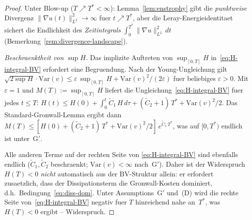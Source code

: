 \documentclass[12pt,a4paper]{article}
\theoremstyle{definition}
\theoremstyle{plain}
\theoremstyle{remark}
\begin{document}
\begin{proof}
Unter Blow-up ($T \nearrow T^* < \infty$):
Lemma~\ref{lem:enstrophy} gibt die \emph{punktweise} Divergenz
$\|\nabla u(t)\|_{L^2}^2 \to \infty$ fuer $t \nearrow T^*$, aber die
Leray-Energieidentitaet sichert die Endlichkeit des \emph{Zeitintegrals}
$\int_0^{T^*}\|\nabla u\|_{L^2}^2\,dt$
(Bemerkung~\ref{rem:divergence-landscape}).

\emph{Beschraenktheit von $\sup H$.}\;
Das implizite Auftreten von $\sup_{[0,T]} H$ in~\eqref{eq:H-integral-BV}
erfordert eine Begruendung. Nach der Young-Ungleichung gilt
$\sqrt{2\sup H}\cdot\mathrm{Var}(v)
\le \varepsilon\,\sup_{[0,T]} H + \mathrm{Var}(v)^2/(2\varepsilon)$
fuer beliebiges $\varepsilon > 0$.
Mit $\varepsilon = 1$ und $M(T) := \sup_{[0,T]} H$ liefert
die Ungleichung~\eqref{eq:H-integral-BV} fuer jedes $t \le T$:
$H(t) \le H(0) + \int_0^t \widetilde{C}_1\,H\,d\tau
+ (\widetilde{C}_2+1)\,T^* + \mathrm{Var}(v)^2/2$.
Das Standard-Gronwall-Lemma ergibt dann
$M(T) \le [H(0) + (\widetilde{C}_2+1)\,T^*
+ \mathrm{Var}(v)^2/2]\,e^{\widetilde{C}_1\,T^*}$,
was auf $[0,T^*)$ endlich ist unter~G$'$.

Alle anderen Terme auf der rechten Seite von
\eqref{eq:H-integral-BV} sind ebenfalls endlich
($\widetilde{C}_1, \widetilde{C}_2$ beschraenkt;
$\mathrm{Var}(v) < \infty$ nach~G$'$).
Daher ist der Widerspruch $H(T) < 0$ \emph{nicht} automatisch aus der
BV-Struktur allein: er erfordert zusaetzlich, dass der Dissipationsterm
die Gronwall-Kosten dominiert, d.h.\ Bedingung~\eqref{eq:diss-dom}.
Unter Assumptions~G$'$ und~(D) wird die rechte Seite
von~\eqref{eq:H-integral-BV} negativ fuer $T$ hinreichend nahe
an~$T^*$, was $H(T) < 0$ ergibt -- Widerspruch.
\end{proof}
\end{document}

